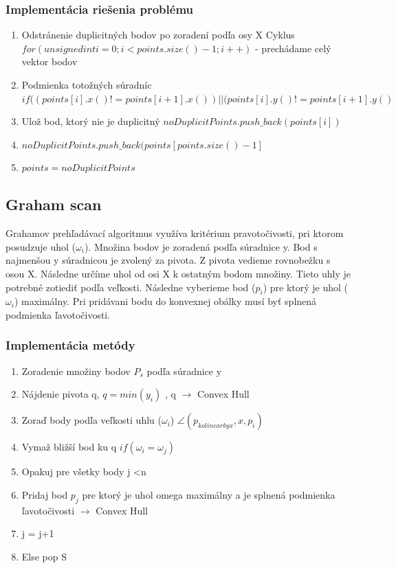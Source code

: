 \documentclass[12pt]{article}
\begin{document}
\subsubsection {Implementácia riešenia problému}
\begin{enumerate}
\item Odstránenie duplicitných bodov po zoradení podľa osy X
\newline Cyklus $ for (unsigned int i = 0 ; i < points.size() - 1; i++)$ - prechádame celý vektor bodov
\item  Podmienka totožných súradníc 
\newline \hspace {1.5cm}   $ if ((points[i].x() != points[i+1].x( )) || (points[i].y() != points[i+1].y( ) $
\item Ulož bod, ktorý nie je duplicitný $ noDuplicitPoints.push\_back(points[i]) $
\item $noDuplicitPoints.push\_back(points[points.size()-1]$
\item $points = noDuplicitPoints$
\end{enumerate}


\subsection {Graham scan}
Grahamov prehľadávací algoritmus využíva kritérium pravotočivosti, pri ktorom posudzuje uhol  ($\omega_i$). Množina bodov je zoradená podľa súradnice y. Bod s najmenšou y súradnicou je zvolený za pivota. Z pivota vedieme rovnobežku s osou X. Následne určíme uhol od osi X k ostatným bodom množiny. Tieto uhly je potrebné zotiediť podľa veľkosti. Následne vyberieme bod  ($p_i$) pre ktorý je uhol  ($\omega_i$) maximálny. Pri pridávani bodu do konvexnej obálky musí byť splnená podmienka ľavotočivosti.

\subsubsection{Implementácia metódy}
\begin{enumerate}
	\item Zoradenie množiny bodov $P_s$ podľa súradnice y 
	\item Nájdenie pivota q, $ q = min(y_i)$ , q $\to$ Convex Hull
	\item Zoraď body podľa veľkosti uhlu  ($\omega_i$) $ \angle(p_{kolinearbyx}, x, p_i)$
	\item Vymaž bližší bod ku q $ if(\omega_i = \omega_j) $
	\item Opakuj pre všetky body j \textless  n
	\item Pridaj bod $p_j$ pre ktorý je uhol omega maximálny a je splnená podmienka ľavotočivosti  $\to$ Convex Hull
	\item \hspace {1.5cm} j = j+1
	\item Else pop S	
\end{enumerate}
\end{document}
